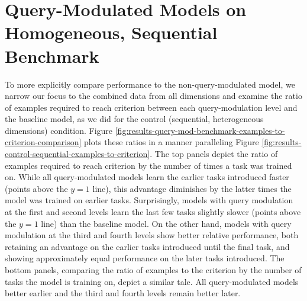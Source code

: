 \FloatBarrier
\section{Query-Modulated Models on Homogeneous, Sequential Benchmark}
To more explicitly compare performance to the non-query-modulated model, we narrow our focus to the combined data from all dimensions and examine the ratio of examples required to reach criterion between each query-modulation level and the baseline model, as we did for the control (sequential, heterogeneous dimensions) condition. Figure \ref{fig:results-query-mod-benchmark-examples-to-criterion-comparison} plots these ratios in a manner paralleling Figure \ref{fig:results-control-sequential-examples-to-criterion}. The top panels depict the ratio of examples required to reach criterion by the number of times a task was trained on. While all query-modulated models learn the earlier tasks introduced faster (points above the $y=1$ line), this advantage diminishes by the latter times the model was trained on earlier tasks. Surprisingly, models with query modulation at the first and second levels learn the last few tasks slightly slower (points above the $y=1$ line) than the baseline model. On the other hand, models with query modulation at the third and fourth levels show better relative performance, both retaining an advantage on the earlier tasks introduced until the final task, and showing approximately equal performance on the later tasks introduced. The bottom panels, comparing the ratio of examples to the criterion by the number of tasks the model is training on, depict a similar tale. All query-modulated models better earlier and the third and fourth levels remain better later. 

